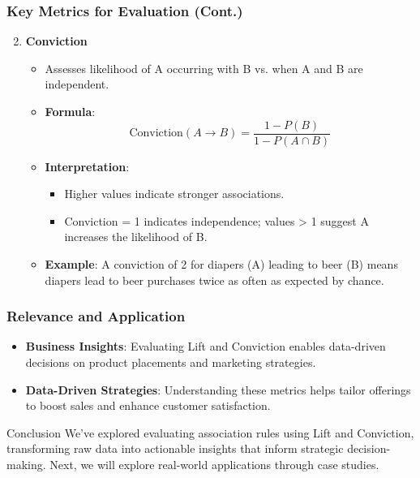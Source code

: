\documentclass[aspectratio=169]{beamer}
\begin{document}
\begin{frame}[fragile]
    \frametitle{Key Metrics for Evaluation (Cont.)}
    \begin{enumerate}
        \setcounter{enumi}{1} %
        \item \textbf{Conviction}
        \begin{itemize}
            \item Assesses likelihood of A occurring with B vs. when A and B are independent.
            \item \textbf{Formula}:
            \begin{equation}
                \text{Conviction}(A \rightarrow B) = \frac{1 - P(B)}{1 - P(A \cap B)}
            \end{equation}
            \item \textbf{Interpretation}:
            \begin{itemize}
                \item Higher values indicate stronger associations.
                \item Conviction = 1 indicates independence; values > 1 suggest A increases the likelihood of B.
            \end{itemize}
            \item \textbf{Example}: A conviction of 2 for diapers (A) leading to beer (B) means diapers lead to beer purchases twice as often as expected by chance.
        \end{itemize}
    \end{enumerate}
\end{frame}

\begin{frame}[fragile]
    \frametitle{Relevance and Application}
    \begin{itemize}
        \item \textbf{Business Insights}: Evaluating Lift and Conviction enables data-driven decisions on product placements and marketing strategies.
        \item \textbf{Data-Driven Strategies}: Understanding these metrics helps tailor offerings to boost sales and enhance customer satisfaction.
    \end{itemize}
    \begin{block}{Conclusion}
        We've explored evaluating association rules using Lift and Conviction, transforming raw data into actionable insights that inform strategic decision-making. Next, we will explore real-world applications through case studies.
    \end{block}
\end{frame}
\end{document}
